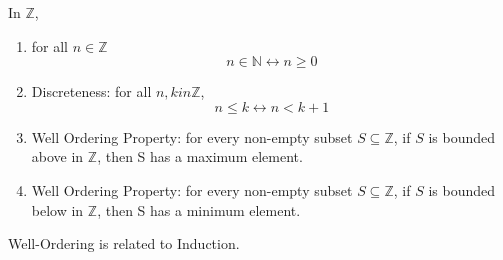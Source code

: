 
\begin{thm}
In $\mathbb{Z}$,
\begin{enumerate}
\item for all $n\in\mathbb{Z}$ \[n\in\mathbb{N} \leftrightarrow n\geq 0\]
\item Discreteness: for all $n,k in \mathbb{Z}$, \[n\leq k \leftrightarrow n<k+1\]
\item Well Ordering Property: for every non-empty subset $S\subseteq \mathbb{Z}$, if $S$ is bounded above in $\mathbb{Z}$, then S has a maximum element.
\item Well Ordering Property: for every non-empty subset $S\subseteq \mathbb{Z}$, if $S$ is bounded below in $\mathbb{Z}$, then S has a minimum element.
\end{enumerate}
\end{thm}

\begin{rem}
Well-Ordering is related to Induction.
\end{rem}